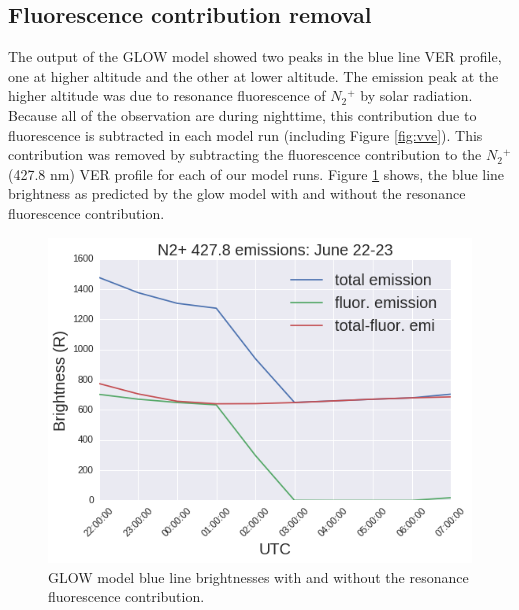 \documentclass[crop=false,class=mitthesis,oneside,font=12pt]{standalone}
\begin{document}
\subsection{Fluorescence contribution removal}
The output of the GLOW model showed two peaks in the blue line VER profile, one at higher altitude and the other at lower altitude. The emission peak at the higher altitude was due to resonance fluorescence of $N{_2}{^+}$ by solar radiation. Because all of the observation are during nighttime, this contribution due to fluorescence is subtracted in each model run (including Figure \ref{fig:vve}). This contribution was removed by subtracting the fluorescence contribution to the $N{_2}{^+}$ (427.8 nm) VER profile for each of our model runs. Figure \ref{fig:fl_rmv} shows, the blue line brightness as predicted by the glow model with and without the resonance fluorescence contribution.
\begin{figure}[H]
	\centering\includegraphics[width=35pc]{flu_cont_rmv.png}
	\caption{GLOW model blue line brightnesses with and without the resonance fluorescence contribution.}
	\label{fig:fl_rmv}
\end{figure}

\end{document}
